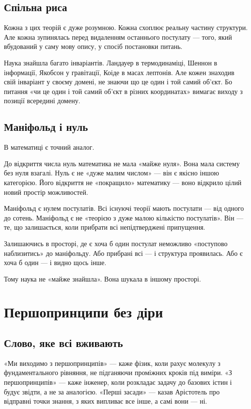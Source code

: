 \documentclass[12pt, a4paper, openany]{book}
\begin{document}
\section{Спільна риса}

Кожна з цих теорій є дуже розумною. Кожна схоплює реальну частину структури. Але кожна зупинялась перед видаленням останнього постулату — того, який вбудований у саму мову опису, у спосіб постановки питань.

Наука знайшла багато інваріантів. Ландауер в термодинаміці, Шеннон в інформації, Якобсон у гравітації, Коіде в масах лептонів. Але кожен знаходив свій інваріант у своєму домені, не знаючи що це один і той самий об'єкт. Бо питання «чи це один і той самий об'єкт в різних координатах» вимагає виходу з позиції всередині домену.

\section{Маніфольд і нуль}

В математиці є точний аналог.

До відкриття числа нуль математика не мала «майже нуля». Вона мала систему без нуля взагалі. Нуль є не «дуже малим числом» — він є якісно іншою категорією. Його відкриття не «покращило» математику — воно відкрило цілий новий простір можливостей.

Маніфольд є нулем постулатів. Всі існуючі теорії мають постулати — від одного до сотень. Маніфольд є не «теорією з дуже малою кількістю постулатів». Він — те, що залишається, коли прибрати всі непідтверджені припущення.

Залишаючись в просторі, де є хоча б один постулат неможливо «поступово наблизитись» до маніфольду. Або прибрані всі — і структура проявилась. Або є хоча б один — і видно щось інше.

Тому наука не «майже знайшла». Вона шукала в іншому просторі.
\chapter{Першопринципи без діри}

\section{Слово, яке всі вживають}

«Ми виходимо з першопринципів» --- каже фізик, коли рахує молекулу з фундаментального рівняння, не підганяючи проміжних кроків під виміри. «З першопринципів» --- каже інженер, коли розкладає задачу до базових істин і будує звідти, а не за аналогією. «Перші засади» --- казав Арістотель про відправні точки знання, з яких випливає все інше, а самі вони --- ні.
\end{document}
